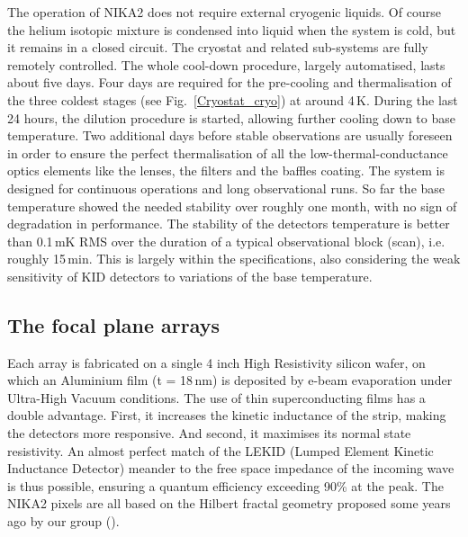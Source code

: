 \documentclass[]{aa} %
\begin{document}
The operation of NIKA2 does not require external cryogenic liquids. Of course the helium isotopic mixture is condensed into liquid when the system is cold, but it remains in a closed circuit. The cryostat and related sub-systems are fully remotely controlled. The whole cool-down procedure, largely automatised, lasts about five days. Four days are required for the pre-cooling and thermalisation of the three coldest stages (see Fig.~\ref{Cryostat_cryo}) at around 4\,K. During the last 24 hours, the dilution procedure is started, allowing further cooling down to base temperature. Two additional days before stable observations are usually foreseen in order to ensure the perfect thermalisation of all the low-thermal-conductance optics elements like the lenses, the filters and the baffles coating. The system is designed for continuous operations and long observational runs. So far the base temperature showed the needed stability over roughly one month, with no sign of degradation in performance. The stability of the detectors temperature is better than 0.1\,mK RMS over the duration of a typical observational block (scan), i.e. roughly 15\,min. This is largely within the specifications, also considering the weak sensitivity of KID detectors to variations of the base temperature. 


 \subsection{The focal plane arrays}

Each array is fabricated on a single 4 inch High Resistivity silicon wafer, on which an Aluminium film (t = 18\,nm) is deposited by e-beam evaporation under Ultra-High Vacuum conditions. The use of thin superconducting films has a double advantage. First, it increases the kinetic inductance of the strip, making the detectors more responsive. And second, it maximises its normal state resistivity. An almost perfect match of the LEKID (Lumped Element Kinetic Inductance Detector) meander to the free space impedance of the incoming wave is thus possible, ensuring a quantum efficiency exceeding 90\% at the peak. The NIKA2 pixels are all based on the Hilbert fractal geometry proposed some years ago by our group (\cite{Roesch2012}). 
\end{document}
